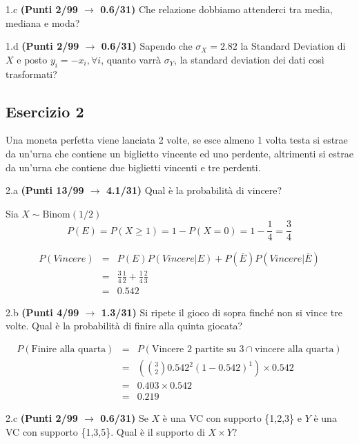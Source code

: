 \documentclass[
  11pt,
]{book}
\theoremstyle{mytheoremstyle}
\theoremstyle{mydefstyle}
\newenvironment{sol}
  {
  \begin{tcolorbox}[enhanced,breakable,arc=0.1mm,boxrule=1pt,colback=white,colframe=iblue,
  title=\bf \fontfamily{lmss}\selectfont \hspace{.5 cm} Soluzione,drop fuzzy shadow]

}{
\end{tcolorbox}
  }
\begin{document}
1.c \textbf{(Punti 2/99 \(\rightarrow\) 0.6/31)} Che relazione dobbiamo attenderci tra media, mediana e moda?

1.d \textbf{(Punti 2/99 \(\rightarrow\) 0.6/31)} Sapendo che \(\sigma_X=2.82\) la Standard Deviation di \(X\)
e posto \(y_i=-x_i, \forall i\), quanto varrà \(\sigma_Y\), la standard deviation dei dati così
trasformati?

\subsection{Esercizio 2}\label{esercizio-2-18}

Una moneta perfetta viene lanciata 2 volte, se esce almeno 1 volta testa si estrae da un'urna che contiene un biglietto vincente ed uno perdente, altrimenti si estrae da un'urna che contiene due biglietti vincenti e tre perdenti.

2.a \textbf{(Punti 13/99 \(\rightarrow\) 4.1/31)} Qual è la probabilità di vincere?

\begin{sol}
Sia \(X\sim\text{Binom}(1/2)\)
\[P(E)=P(X\ge 1)=1-P(X=0)=1-\frac 14=\frac 34\]

\begin{eqnarray*}
  P(Vincere) &=& P(E)P(Vincere|E)+P(\bar E)P(Vincere|\bar E)\\
  &=& \frac 34\frac 12 + \frac 14 \frac 23\\
  &=& 0.542
\end{eqnarray*}

\end{sol}

2.b \textbf{(Punti 4/99 \(\rightarrow\) 1.3/31)} Si ripete il gioco di sopra finché non si vince tre volte. Qual è la probabilità di finire alla quinta giocata?

\begin{sol}
\begin{eqnarray*}
  P(\text{Finire alla quarta}) &=&  P(\text{Vincere 2 partite su 3}\cap\text{vincere alla quarta})\\
  &=& \left(\binom{3}{2}0.542^2(1-0.542)^1\right)\times 0.542\\
  &=& 0.403\times 0.542\\
  &=& 0.219
\end{eqnarray*}

\end{sol}

2.c \textbf{(Punti 2/99 \(\rightarrow\) 0.6/31)} Se \(X\) è una VC con supporto \{1,2,3\} e \(Y\) è una VC con
supporto \{1,3,5\}.
Qual è il supporto di \(X\times Y\)?
\end{document}
